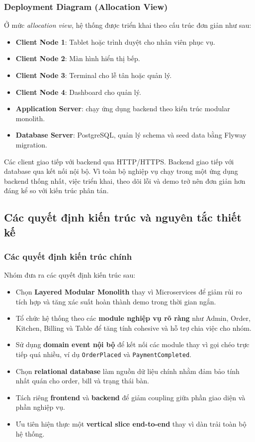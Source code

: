 \documentclass[12pt,a4paper]{article}
\begin{document}
\subsubsection{Deployment Diagram (Allocation View)}

Ở mức \textit{allocation view}, hệ thống được triển khai theo cấu trúc đơn giản như sau:
\begin{itemize}
    \item \textbf{Client Node 1}: Tablet hoặc trình duyệt cho nhân viên phục vụ.
    \item \textbf{Client Node 2}: Màn hình hiển thị bếp.
    \item \textbf{Client Node 3}: Terminal cho lễ tân hoặc quản lý.
    \item \textbf{Client Node 4}: Dashboard cho quản lý.
    \item \textbf{Application Server}: chạy ứng dụng backend theo kiến trúc modular monolith.
    \item \textbf{Database Server}: PostgreSQL, quản lý schema và seed data bằng Flyway migration.
\end{itemize}

Các client giao tiếp với backend qua HTTP/HTTPS. Backend giao tiếp với database qua kết nối nội bộ. Vì toàn bộ nghiệp vụ chạy trong một ứng dụng backend thống nhất, việc triển khai, theo dõi lỗi và demo trở nên đơn giản hơn đáng kể so với kiến trúc phân tán.

\subsection{Các quyết định kiến trúc và nguyên tắc thiết kế}

\subsubsection{Các quyết định kiến trúc chính}

Nhóm đưa ra các quyết định kiến trúc sau:
\begin{itemize}
    \item Chọn \textbf{Layered Modular Monolith} thay vì Microservices để giảm rủi ro tích hợp và tăng xác suất hoàn thành demo trong thời gian ngắn.
    \item Tổ chức hệ thống theo các \textbf{module nghiệp vụ rõ ràng} như Admin, Order, Kitchen, Billing và Table để tăng tính cohesive và hỗ trợ chia việc cho nhóm.
    \item Sử dụng \textbf{domain event nội bộ} để kết nối các module thay vì gọi chéo trực tiếp quá nhiều, ví dụ \texttt{OrderPlaced} và \texttt{PaymentCompleted}.
    \item Chọn \textbf{relational database} làm nguồn dữ liệu chính nhằm đảm bảo tính nhất quán cho order, bill và trạng thái bàn.
    \item Tách riêng \textbf{frontend} và \textbf{backend} để giảm coupling giữa phần giao diện và phần nghiệp vụ.
    \item Ưu tiên hiện thực một \textbf{vertical slice end-to-end} thay vì dàn trải toàn bộ hệ thống.
\end{itemize}
\end{document}
